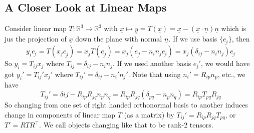\subsection{A Closer Look at Linear Maps}
Consider linear map $T:\mathbb R^3\to\mathbb R^3$ with $\underline{x}\mapsto\underline{y}=T(\underline{x})=\underline{x}-(\underline{x}\cdot\underline{n})\underline{n}$ which is jus the projection of $\underline{x}$ down the plane with normal $\underline{n}$.
If we use basis $\{\underline{e_i}\}$, then
$$y_i\underline{e_i}=T(x_j\underline{e_j})=x_jT(\underline{e_j})=x_j(\underline{e_j}-n_in_j\underline{e_i})=x_j(\delta_{ij}-n_in_j)\underline{e_i}$$
So $y_i=T_{ij}x_j$ where $T_{ij}=\delta_{ij}-n_in_j$.
If we used another basis $\underline{e_i'}$, we would have got $y_i'=T_{ij}'x_j'$ where $T_{ij}'=\delta_{ij}-n_i'n_j'$.
Note that using $n_i'=R_{ip}n_p$, etc., we have
$$T_{ij}'=\delta{ij}-R_{ip}R_{jq}n_pn_q=R_{ip}R_{jq}(\delta_{pq}-n_pn_q)=R_{ip}T_{pq}R_{jq}$$
So changing from one set of right handed orthonormal basis to another induces change in components of linear map $T$ (as a matrix) by $T_{ij}'=R_{ip}R_{jq}T_{pq}$, or $T'=RTR^\top$.
We call objects changing like that to be rank-$2$ tensors.
